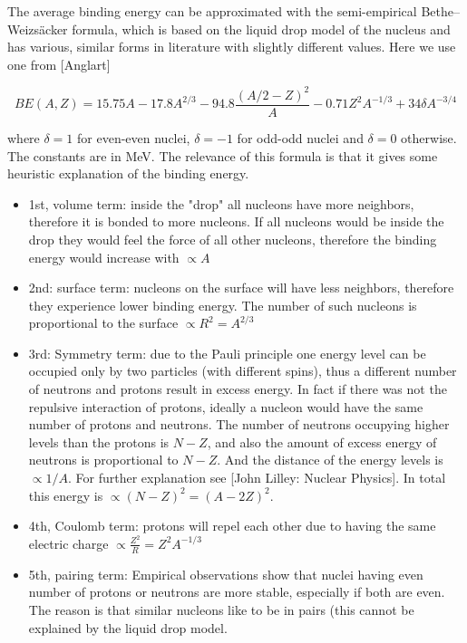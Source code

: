 The average binding energy can be approximated with the semi-empirical Bethe–Weizs\"acker formula, which is based on the liquid drop model of the nucleus and has various, similar forms in literature with slightly different values. Here we use one from [Anglart]

\begin{equation}
BE(A,Z)=15.75A-17.8A^{2/3}-94.8\frac{(A/2 - Z)^2}{A}-0.71Z^2A^{-1/3}+34\delta A^{-3/4}
\end{equation}

where $\delta = 1$ for even-even nuclei, $\delta = -1$ for odd-odd nuclei and $\delta = 0$ otherwise. The constants are in MeV. The relevance of this formula is that it gives some heuristic explanation of the binding energy.

\begin{itemize}
\item 1st, volume term: inside the "drop" all nucleons have more neighbors, therefore it is bonded to more nucleons. If all nucleons would be inside the drop they would feel the force of all other nucleons, therefore the binding energy would increase with $\propto A$
\item 2nd: surface term: nucleons on the surface will have less neighbors, therefore they experience lower binding energy. The number of such nucleons is proportional to the surface $\propto R^2=A^{2/3}$
\item 3rd: Symmetry term: due to the Pauli principle one energy level can be occupied only by two particles (with different spins), thus a different number of neutrons and protons result in excess energy. In fact if there was not the repulsive interaction of protons, ideally a nucleon would have the same number of protons and neutrons. The number of neutrons occupying higher levels than the protons is $N-Z$, and also the amount of excess energy of neutrons is proportional to $N-Z$. And the distance of the energy levels is $\propto 1/A$. For further explanation see [John Lilley: Nuclear Physics]. In total this energy is $\propto (N-Z)^2=(A-2Z)^2$. 
\item 4th, Coulomb term: protons will repel each other due to having the same electric charge $\propto \frac{Z^2}{R}=Z^2A^{-1/3}$
\item 5th, pairing term: Empirical observations show that nuclei having even number of protons or neutrons are more stable, especially if both are even. The reason is that similar nucleons like to be in pairs (this cannot be explained by the liquid drop model. 
\end{itemize}
 

